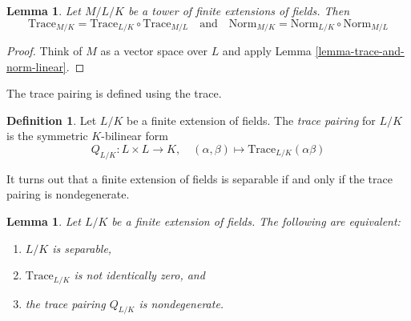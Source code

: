 \documentclass{stacks-project}
\theoremstyle{plain}
\newtheorem{lemma}[subsection]{Lemma}
\theoremstyle{definition}
\newtheorem{definition}[subsection]{Definition}
\theoremstyle{remark}
\numberwithin{equation}{subsection}
\begin{document}
\begin{lemma}
\label{lemma-trace-and-norm-tower}
Let $M/L/K$ be a tower of finite extensions of fields. Then
$$
\text{Trace}_{M/K} = \text{Trace}_{L/K} \circ \text{Trace}_{M/L}
\quad\text{and}\quad
\text{Norm}_{M/K} = \text{Norm}_{L/K} \circ \text{Norm}_{M/L}
$$
\end{lemma}

\begin{proof}
Think of $M$ as a vector space over $L$ and apply
Lemma \ref{lemma-trace-and-norm-linear}.
\end{proof}

\noindent
The trace pairing is defined using the trace.

\begin{definition}
\label{definition-trace-pairing}
Let $L/K$ be a finite extension of fields. The {\it trace pairing}
for $L/K$ is the symmetric $K$-bilinear form
$$
Q_{L/K} : L \times L \longrightarrow K,\quad
(\alpha, \beta) \longmapsto \text{Trace}_{L/K}(\alpha\beta)
$$
\end{definition}

\noindent
It turns out that a finite extension of fields is separable if and only
if the trace pairing is nondegenerate.

\begin{lemma}
\label{lemma-separable-trace-pairing}
Let $L/K$ be a finite extension of fields. The following are equivalent:
\begin{enumerate}
\item $L/K$ is separable,
\item $\text{Trace}_{L/K}$ is not identically zero, and
\item the trace pairing $Q_{L/K}$ is nondegenerate.
\end{enumerate}
\end{lemma}
\end{document}
